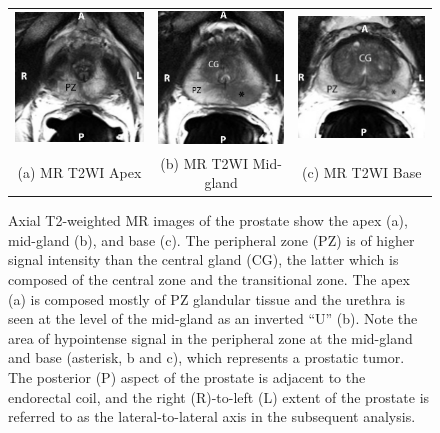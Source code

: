 \begin{figure}
\centering
\begin{tabular}{ccc}
\includegraphics[width=0.29\linewidth]{figs/mr_anatomy/T2_apex} &
\includegraphics[width=0.275\linewidth]{figs/mr_anatomy/T2_midgland} &
\includegraphics[width=0.3\linewidth]{figs/mr_anatomy/T2_base} \\
(a) MR T2WI Apex & (b) MR T2WI Mid-gland & (c) MR T2WI Base \\
\end{tabular}
\caption{Axial T2-weighted MR images of the prostate show the apex (a),
    mid-gland (b), and base (c).  The peripheral zone (PZ) is of higher signal
    intensity than the central gland (CG), the latter which is composed of the
    central zone and the transitional zone. The apex (a) is composed mostly of
    PZ glandular tissue and the urethra is seen at the level of the mid-gland as
    an inverted ``U'' (b). Note the area of hypointense signal in the
    peripheral zone at the mid-gland and base (asterisk, b and c), which
    represents a prostatic tumor.  The posterior (P) aspect of the prostate is
    adjacent to the endorectal coil, and the right (R)-to-left (L) extent of
    the prostate is referred to as the lateral-to-lateral axis in the subsequent
    analysis.}
\label{fig:mr_anatomy} 
\end{figure}
